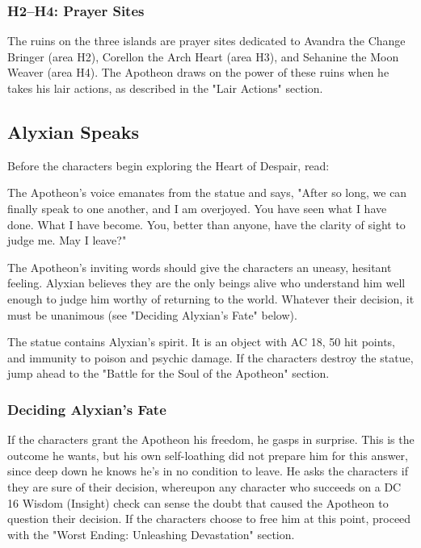 \documentclass[10pt,a4paper,twoside,bg=print,twocolumn,openany,nodeprecatedcode]{dndbook}
\begin{document}
\subsubsection{H2–H4: Prayer Sites}
The ruins on the three islands are prayer sites dedicated to Avandra the Change Bringer (area H2), Corellon the Arch Heart (area H3), and Sehanine the Moon Weaver (area H4). The Apotheon draws on the power of these ruins when he takes his lair actions, as described in the "Lair Actions" section.

\subsection{Alyxian Speaks}
Before the characters begin exploring the Heart of Despair, read:

\begin{DndReadAloud}{}
The Apotheon's voice emanates from the statue and says, "After so long, we can finally speak to one another, and I am overjoyed. You have seen what I have done. What I have become. You, better than anyone, have the clarity of sight to judge me. May I leave?"

\end{DndReadAloud}

The Apotheon's inviting words should give the characters an uneasy, hesitant feeling. Alyxian believes they are the only beings alive who understand him well enough to judge him worthy of returning to the world. Whatever their decision, it must be unanimous (see "Deciding Alyxian's Fate" below).

The statue contains Alyxian's spirit. It is an object with AC 18, 50 hit points, and immunity to poison and psychic damage. If the characters destroy the statue, jump ahead to the "Battle for the Soul of the Apotheon" section.

\subsubsection{Deciding Alyxian's Fate}
If the characters grant the Apotheon his freedom, he gasps in surprise. This is the outcome he wants, but his own self-loathing did not prepare him for this answer, since deep down he knows he's in no condition to leave. He asks the characters if they are sure of their decision, whereupon any character who succeeds on a DC 16 Wisdom (Insight) check can sense the doubt that caused the Apotheon to question their decision. If the characters choose to free him at this point, proceed with the "Worst Ending: Unleashing Devastation" section.
\end{document}
